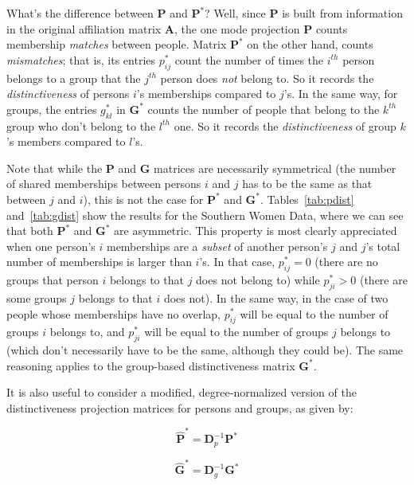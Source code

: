 \documentclass[a4paper,fleqn]{cas-sc}
\begin{document}
What's the difference between $\mathbf{P}$ and $\mathbf{P^*}$? Well, since $\mathbf{P}$ is built from information in the original affiliation matrix $\mathbf{A}$, the one mode projection $\mathbf{P}$ counts membership \textit{matches} between people. Matrix $\mathbf{P^*}$ on the other hand, counts \textit{mismatches}; that is, its entries $p^*_{ij}$ count the number of times the $i^{th}$ person belongs to a group that the $j^{th}$ person does \textit{not} belong to. So it records the \textit{distinctiveness} of persons $i$'s memberships compared to $j$'s. In the same way, for groups, the entries $g^*_{kl}$ in $\mathbf{G^*}$ counts the number of people that belong to the $k^{th}$ group who don't belong to the $l^{th}$ one. So it records the \textit{distinctiveness} of group $k$'s members compared to $l$'s. 

Note that while the $\mathbf{P}$ and $\mathbf{G}$ matrices are necessarily symmetrical (the number of shared memberships between persons $i$ and $j$ has to be the same as that between $j$ and $i$), this is not the case for $\mathbf{P^*}$ and $\mathbf{G^*}$. Tables~\ref{tab:pdist} and~\ref{tab:gdist} show the results for the Southern Women Data, where we can see that both $\mathbf{P^*}$ and $\mathbf{G^*}$ are asymmetric. This property is most clearly appreciated when one person's $i$ memberships are a \textit{subset} of another person's $j$ and $j$'s total number of memberships is larger than $i$'s. In that case, $p^*_{ij} = 0$ (there are no groups that person $i$ belongs to that $j$ does not belong to) while $p^*_{ji} > 0$ (there are some groups $j$ belongs to that $i$ does not). In the same way, in the case of two people whose memberships have no overlap, $p^*_{ij}$ will be equal to the number of groups $i$ belongs to, and $p^*_{ji}$ will be equal to the number of groups $j$ belongs to (which don't necessarily have to be the same, although they could be).  The same reasoning applies to the group-based distinctiveness matrix $\mathbf{G^*}$.

It is also useful to consider a modified, degree-normalized version of the distinctiveness projection matrices for persons and groups, as given by: 

\begin{equation}
    \hat{\textbf{P}}^* = \textbf{D}_p^{-1}\textbf{P}^*
\end{equation}

\begin{equation}
    \hat{\textbf{G}}^* = \textbf{D}_g^{-1}\textbf{G}^*
\end{equation}
\end{document}
